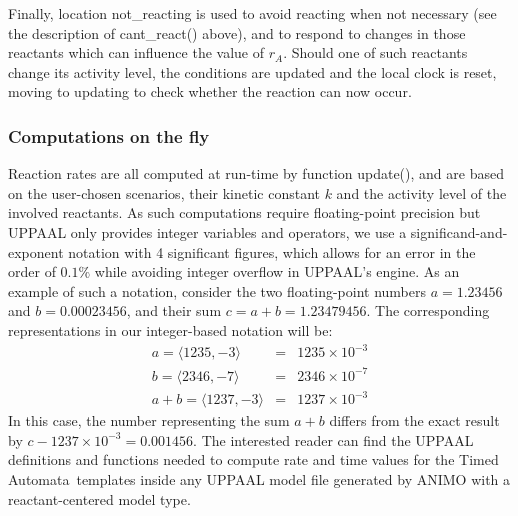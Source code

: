 \documentclass{bmcart}
\def\tas{Timed Automata}
\begin{document}
Finally, location {\sf not\_reacting} is used to avoid reacting when not necessary (see the description
of {\sf cant\_react()} above), and to respond to changes in those reactants
which can influence the value of $r_A$. Should one of such reactants change its activity level, the
conditions are updated and the local clock is reset, moving to {\sf updating} to check whether the reaction can now
occur.

\subsubsection*{Computations on the fly}\label{sec:rates-ta-model}
Reaction rates are all computed at run-time by function {\sf update()},
and are based on the user-chosen scenarios, their kinetic constant $k$ and the activity level of the involved reactants.
As such computations require floating-point precision but UPPAAL only provides integer
variables and operators, we use a significand-and-exponent notation with 4 significant figures, which allows for an error
in the order of $0.1 \%$ while 
avoiding integer overflow in UPPAAL's engine. As an example of such a notation, consider the two floating-point numbers
$a = 1.23456$ and $b = 0.00023456$, and their sum $c = a + b = 1.23479456$. The corresponding representations in
our integer-based notation will be:
$$
\begin{array}{rcl}
  a = \langle 1235, -3 \rangle &=& 1235 \times 10^{-3}\\
  b = \langle 2346, -7 \rangle &=& 2346 \times 10^{-7}\\
  a + b = \langle 1237, -3 \rangle &=& 1237 \times 10^{-3}
\end{array}
$$
In this case, the number representing the sum $a + b$ differs from the exact result by $c - 1237 \times 10^{-3} = 0.001456$.
The interested reader can find the UPPAAL definitions and functions needed to compute rate and time values for the \tas\ templates
inside any UPPAAL model file generated by ANIMO with a reactant-centered model type.
\end{document}

